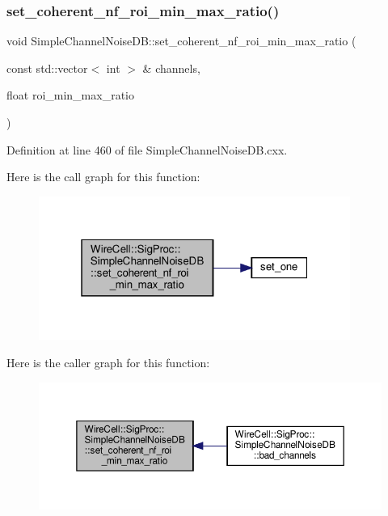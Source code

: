 \subsubsection{\texorpdfstring{set\+\_\+coherent\+\_\+nf\+\_\+roi\+\_\+min\+\_\+max\+\_\+ratio()}{set\_coherent\_nf\_roi\_min\_max\_ratio()}}
{\footnotesize\ttfamily void Simple\+Channel\+Noise\+D\+B\+::set\+\_\+coherent\+\_\+nf\+\_\+roi\+\_\+min\+\_\+max\+\_\+ratio (\begin{DoxyParamCaption}\item[{const std\+::vector$<$ int $>$ \&}]{channels,  }\item[{float}]{roi\+\_\+min\+\_\+max\+\_\+ratio }\end{DoxyParamCaption})}



Definition at line 460 of file Simple\+Channel\+Noise\+D\+B.\+cxx.

Here is the call graph for this function\+:
\nopagebreak
\begin{figure}[H]
\begin{center}
\leavevmode
\includegraphics[width=289pt]{class_wire_cell_1_1_sig_proc_1_1_simple_channel_noise_d_b_a92f9ca90518ecd1833bb3e4dfcbf9488_cgraph}
\end{center}
\end{figure}
Here is the caller graph for this function\+:
\nopagebreak
\begin{figure}[H]
\begin{center}
\leavevmode
\includegraphics[width=350pt]{class_wire_cell_1_1_sig_proc_1_1_simple_channel_noise_d_b_a92f9ca90518ecd1833bb3e4dfcbf9488_icgraph}
\end{center}
\end{figure}
\mbox{\label{class_wire_cell_1_1_sig_proc_1_1_simple_channel_noise_d_b_a6c9fc361d1a4b92415cb41ff2ee33ae4}} 

